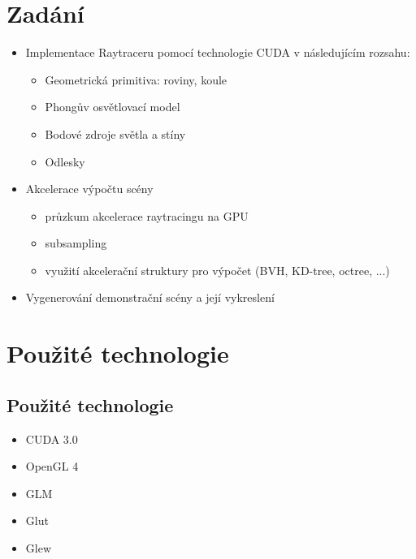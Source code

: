 \documentclass[12pt,a4paper,titlepage,final]{report}
\begin{document}
	\def\authora{Michal Riša}
	\def\authorb{Pavel Macenauer}
	\def\emaila{xbures19@stud.fit.vutbr.cz}
	\def\emailb{xmacen02@stud.fit.vutbr.cz}
	\def\docname{Počítačová grafika}
	\def\projname{Raytracing na CUDA}
	
	\newpage
	\pagestyle{plain}
	\setcounter{page}{1}
	\setcounter{secnumdepth}{-1}
	\setlength{\parindent}{1cm}	

\section{Zadání}

\begin{itemize}
	\item Implementace Raytraceru pomocí technologie CUDA v následujícím rozsahu:
	\begin{itemize}
		\item Geometrická primitiva: roviny, koule
		\item Phongův osvětlovací model
		\item Bodové zdroje světla a stíny
		\item Odlesky
	\end{itemize}
	\item Akcelerace výpočtu scény
	\begin{itemize}
		\item průzkum akcelerace raytracingu na GPU
		\item subsampling
		\item využití akcelerační struktury pro výpočet (BVH, KD-tree, octree, ...)
	\end{itemize}
	\item Vygenerování demonstrační scény a její vykreslení
\end{itemize}

\section{Použité technologie}

\subsection{Použité technologie}
\begin{itemize}
	\item CUDA 3.0
	\item OpenGL 4
	\item GLM
	\item Glut
	\item Glew
\end{itemize}
\end{document}
